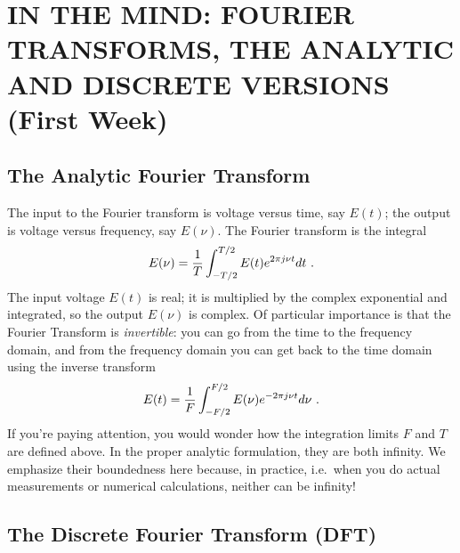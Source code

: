 \documentclass[12pt,preprint]{aastex}
\begin{document}
\section{IN THE MIND: FOURIER TRANSFORMS, THE ANALYTIC AND DISCRETE 
VERSIONS (First Week)} 
\label{pwrspectrum}
 
\subsection{The Analytic Fourier Transform}

        The input to the Fourier transform is voltage versus time, say
        $E(t)$; the output is voltage versus frequency, say $E(\nu)$.
        The Fourier transform is the integral
% 
\begin{equation} \label{ift}
E(\nu) = {1 \over T} \int_{-T/2}^{T/2} E(t) e^{2 \pi j \nu t} dt \ .
\end{equation}
% 
\noindent The input voltage $E(t)$ is real; it is multiplied by the complex
exponential and integrated, so the output $E(\nu)$ is complex. Of particular
importance is that the Fourier Transform is {\it invertible}: you can go
from the time to the frequency domain, and from the frequency domain you can
get back to the time domain using the inverse transform
%
\begin{equation}
E(t) = {1 \over F} \int_{-F/2}^{F/2} E(\nu) e^{-2 \pi j \nu t} d\nu \ .
\end{equation}
% 
 If you're paying attention, you would wonder how
the integration limits $F$ and $T$ are defined above. In the proper
analytic formulation, they are both infinity. We emphasize their
boundedness here because, in practice, i.e.\ when you do actual
measurements or numerical calculations, neither can be infinity!

\subsection{The Discrete Fourier Transform (DFT)} \label{dft}
\end{document}
